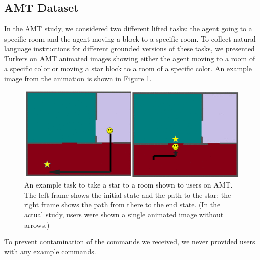 \documentclass[conference]{IEEEtran}
\begin{document}
\subsection{AMT Dataset}
In the AMT study, we considered two different lifted tasks: the agent going to a specific room and the agent moving a block to a specific room. To collect natural language instructions for different grounded versions of these tasks, we presented Turkers on AMT animated images showing either the agent moving to a room of a specific color or moving a star block to a room of a specific color. An example image from the animation is shown in Figure \ref{fig:animation}.
\begin{figure}[tp]
\begin{center}
\includegraphics[width=\columnwidth]{images/map1_2a}
\caption{An example task to take a star to a room shown to users on AMT. The left frame shows the initial state and the path to the star; the right frame shows the path from there to the end state. (In the actual study, users were shown a single animated image without arrows.)}
\label{fig:animation}
\end{center}
\end{figure}
To prevent contamination of the commands we received, we never provided users with any example commands. 
\end{document}

